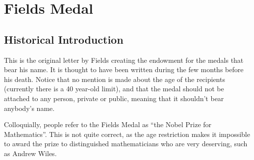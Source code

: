 \section{Fields Medal}

\subsection{Historical Introduction}

This is the original letter by Fields creating the endowment for the
medals that bear his name.
It is thought to have been written during the few months before his death.
Notice that no mention is made about the age of the recipients
(currently there is a 40 year-old limit), and that the medal should
not be attached to any person, private or public, meaning that it
shouldn't bear anybody's name.

Colloquially, people refer to the Fields Medal as ``the Nobel Prize for
Mathematics''. This is not quite correct, as the age restriction 
makes it impossible to award the prize to distinguished mathematicians
who are very deserving, such as Andrew Wiles. 


